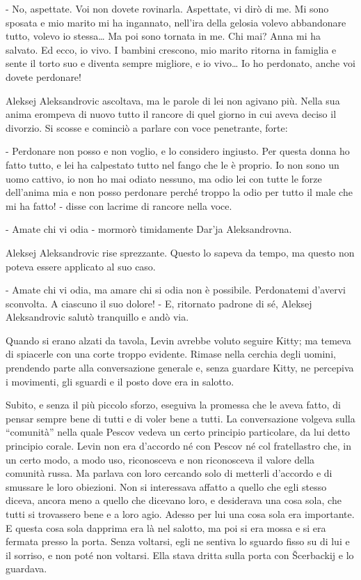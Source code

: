 - No, aspettate. Voi non dovete rovinarla. Aspettate, vi dirò di me. Mi sono sposata e mio marito mi ha ingannato, nell'ira della gelosia volevo abbandonare tutto, volevo io stessa\ldots{} Ma poi sono tornata in me. Chi mai? Anna mi ha salvato. Ed ecco, io vivo. I bambini crescono, mio marito ritorna in famiglia e sente il torto suo e diventa sempre migliore, e io vivo\ldots{} Io ho perdonato, anche voi dovete perdonare! 

Aleksej Aleksandrovic ascoltava, ma le parole di lei non agivano più. Nella sua anima erompeva di nuovo tutto il rancore di quel giorno in cui aveva deciso il divorzio. Si scosse e cominciò a parlare con voce penetrante, forte: 

- Perdonare non posso e non voglio, e lo considero ingiusto. Per questa donna ho fatto tutto, e lei ha calpestato tutto nel fango che le è proprio. Io non sono un uomo cattivo, io non ho mai odiato nessuno, ma odio lei con tutte le forze dell'anima mia e non posso perdonare perché troppo la odio per tutto il male che mi ha fatto! - disse con lacrime di rancore nella voce. 

- Amate chi vi odia - mormorò timidamente Dar'ja Aleksandrovna. 

Aleksej Aleksandrovic rise sprezzante. Questo lo sapeva da tempo, ma questo non poteva essere applicato al suo caso. 

- Amate chi vi odia, ma amare chi si odia non è possibile. Perdonatemi d'avervi sconvolta. A ciascuno il suo dolore! - E, ritornato padrone di sé, Aleksej Aleksandrovic salutò tranquillo e andò via. 

\label{xiii-3} 

Quando si erano alzati da tavola, Levin avrebbe voluto seguire Kitty; ma temeva di spiacerle con una corte troppo evidente. Rimase nella cerchia degli uomini, prendendo parte alla conversazione generale e, senza guardare Kitty, ne percepiva i movimenti, gli sguardi e il posto dove era in salotto. 

Subito, e senza il più piccolo sforzo, eseguiva la promessa che le aveva fatto, di pensar sempre bene di tutti e di voler bene a tutti. La conversazione volgeva sulla ``comunità'' nella quale Pescov vedeva un certo principio particolare, da lui detto principio corale. Levin non era d'accordo né con Pescov né col fratellastro che, in un certo modo, a modo uso, riconosceva e non riconosceva il valore della comunità russa. Ma parlava con loro cercando solo di metterli d'accordo e di smussare le loro obiezioni. Non si interessava affatto a quello che egli stesso diceva, ancora meno a quello che dicevano loro, e desiderava una cosa sola, che tutti si trovassero bene e a loro agio. Adesso per lui una cosa sola era importante. E questa cosa sola dapprima era là nel salotto, ma poi si era mossa e si era fermata presso la porta. Senza voltarsi, egli ne sentiva lo sguardo fisso su di lui e il sorriso, e non poté non voltarsi. Ella stava dritta sulla porta con Šcerbackij e lo guardava. 

